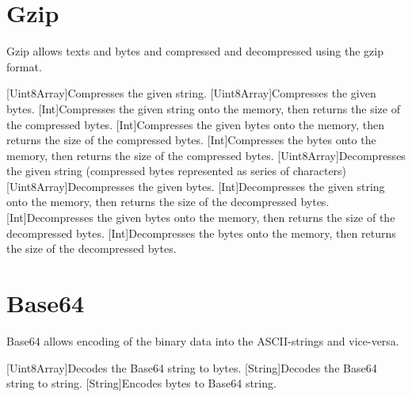 \section{Gzip}

Gzip allows texts and bytes and compressed and decompressed using the gzip format.


\begin{outline}
\1[Uint8Array]{Compresses the given string.}
\1[Uint8Array]{Compresses the given bytes.}
\1[Int]{Compresses the given string onto the memory, then returns the size of the compressed bytes.}
\1[Int]{Compresses the given bytes onto the memory, then returns the size of the compressed bytes.}
\1[Int]{Compresses the bytes onto the memory, then returns the size of the compressed bytes.}
\1[Uint8Array]{Decompresses the given string (compressed bytes represented as series of characters)}
\1[Uint8Array]{Decompresses the given bytes.}
\1[Int]{Decompresses the given string onto the memory, then returns the size of the decompressed bytes.}
\1[Int]{Decompresses the given bytes onto the memory, then returns the size of the decompressed bytes.}
\1[Int]{Decompresses the bytes onto the memory, then returns the size of the decompressed bytes.}
\end{outline}



\section{Base64}

Base64 allows encoding of the binary data into the ASCII-strings and vice-versa.


\begin{outline}
\1[Uint8Array]{Decodes the Base64 string to bytes.}
\1[String]{Decodes the Base64 string to string.}
\1[String]{Encodes bytes to Base64 string.}
\end{outline}



